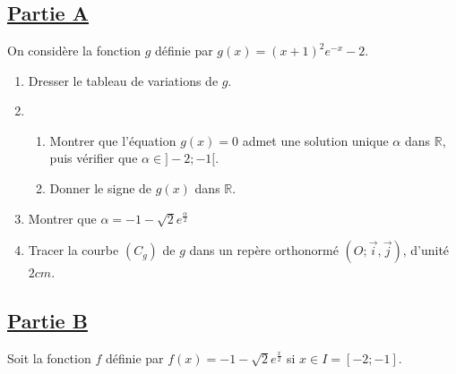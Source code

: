 \documentclass[12pt,a4paper]{article}
\begin{document}
\section*{} 

\subsection*{\underline{\textbf{Partie A}}}

On considère la fonction \( g \) définie par  \(g(x) = (x+1)^2 e^{-x} - 2.\)

\begin{enumerate}
    \item Dresser le tableau de variations de \( g \).
    \item 
    \begin{enumerate}
        \item Montrer que l’équation \( g(x) = 0 \) admet une solution unique \( \alpha \) dans \( \mathbb{R} \), puis vérifier que \( \alpha \in ]-2; -1[ \).
        \item Donner le signe de \( g(x) \) dans \( \mathbb{R} \).
    \end{enumerate}
    \item Montrer que \( \alpha = -1 - \sqrt{2} e^{\frac{\alpha}{2}} \)
    \item Tracer la courbe \( (C_g) \) de \( g \) dans un repère orthonormé \( (O; \vec{i}, \vec{j}) \), d’unité \( 2cm \).
\end{enumerate}

\subsection*{\underline{\textbf{Partie B}}}

Soit la fonction \( f \) définie par \( f(x) = -1 - \sqrt{2} e^{\frac{x}{2}} \)
si \( x \in I = [-2; -1] \).
\end{document}
